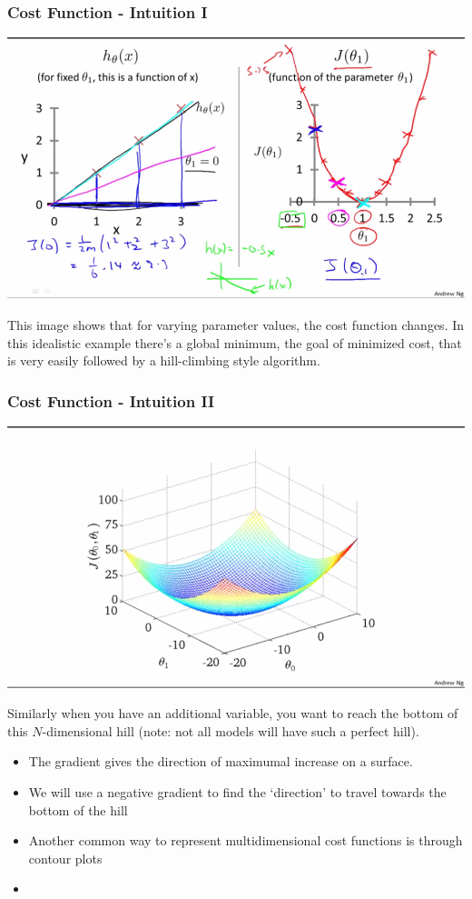 \subsubsection{Cost Function - Intuition I}
\begin{center}
	\includegraphics[scale=0.75]{sections/cs229/w1/cost_function.png}
\end{center}
This image shows that for varying parameter values, the cost function changes. In this idealistic example there's a global minimum, the goal of minimized cost, that is very easily followed by a hill-climbing style algorithm.

\subsubsection{Cost Function - Intuition II}
\begin{center}
	\includegraphics[scale=0.75]{sections/cs229/w1/2d_cost_function.png}
\end{center}
Similarly when you have an additional variable, you want to reach the bottom of this $N$-dimensional hill (note: not all models will have such a perfect hill). 
\begin{itemize}[--]
	\item The gradient gives the direction of maximumal increase on a surface.
	\item We will use a negative gradient to find the `direction' to travel towards the bottom of the hill
	\item Another common way to represent multidimensional cost functions is through contour plots
	\item 
\end{itemize}

